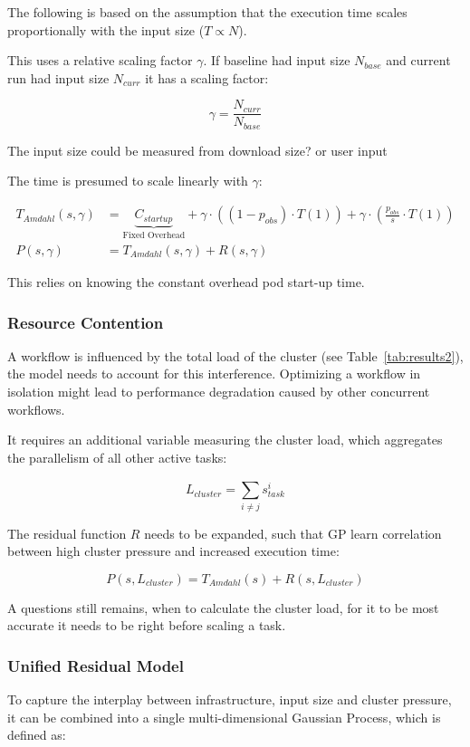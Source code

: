 \documentclass[a4paper, 12pt]{article}
\begin{document}
	The following is based on the assumption that the execution time scales proportionally with the input size ($T \propto N$).
	
	This uses a relative scaling factor $\gamma$. If baseline had input size $N_{base}$ and current run had input size $N_{curr}$ it has a scaling factor:
	
	\[
	\gamma = \frac{N_{curr}}{N_{base}}
	\]
	
	The input size could be measured from download size? or user input
	
	The time is presumed to scale linearly with $\gamma$:
	
	\begin{align*}
		T_{Amdahl}(s, \gamma) &= \underbrace{C_{startup}}_{\text{Fixed Overhead}} + \gamma \cdot \left((1 - p_{obs}) \cdot T(1)\right) + \gamma \cdot \left(\frac{p_{obs}}{s} \cdot T(1)\right) \\[9pt]
		P(s, \gamma) &= T_{Amdahl}(s, \gamma) + R(s, \gamma)
	\end{align*}
	
	This relies on knowing the constant overhead pod start-up time.
	
	
	
	\subsubsection*{Resource Contention}
	A workflow is influenced by the total load of the cluster (see Table~\ref{tab:results2}), the model needs to account for this interference. Optimizing a workflow in isolation might lead to performance degradation caused by other concurrent workflows.
	
	It requires an additional variable measuring the cluster load, which aggregates the parallelism of all other active tasks:
	
	\[
	L_{cluster} = \sum_{i \neq j}^{} s_{task}^i
	\]
	
	The residual function $R$ needs to be expanded, such that GP learn correlation between high cluster pressure and increased execution time:
	
	\[
	P(s, L_{cluster}) = T_{Amdahl}(s) + R(s, L_{cluster})
	\]
	
	A questions still remains, when to calculate the cluster load, for it to be most accurate it needs to be right before scaling a task.
	
	
	\subsubsection*{Unified Residual Model}
	To capture the interplay between infrastructure, input size and cluster pressure, it can be combined into a single multi-dimensional Gaussian Process, which is defined as:
	
\end{document}
